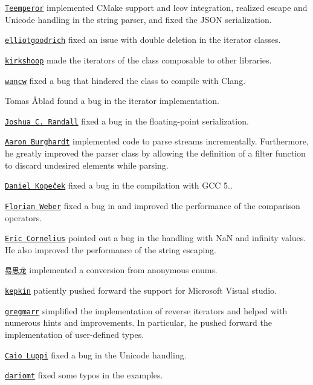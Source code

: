 \begin{DoxyItemize}
\item \href{https://github.com/Teemperor}{\tt Teemperor} implemented C\+Make support and lcov integration, realized escape and Unicode handling in the string parser, and fixed the J\+S\+ON serialization.
\item \href{https://github.com/elliotgoodrich}{\tt elliotgoodrich} fixed an issue with double deletion in the iterator classes.
\item \href{https://github.com/kirkshoop}{\tt kirkshoop} made the iterators of the class composable to other libraries.
\item \href{https://github.com/wanwc}{\tt wancw} fixed a bug that hindered the class to compile with Clang.
\item Tomas Åblad found a bug in the iterator implementation.
\item \href{https://github.com/jrandall}{\tt Joshua C. Randall} fixed a bug in the floating-\/point serialization.
\item \href{https://github.com/aburgh}{\tt Aaron Burghardt} implemented code to parse streams incrementally. Furthermore, he greatly improved the parser class by allowing the definition of a filter function to discard undesired elements while parsing.
\item \href{https://github.com/dkopecek}{\tt Daniel Kopeček} fixed a bug in the compilation with G\+CC 5..
\item \href{https://github.com/Florianjw}{\tt Florian Weber} fixed a bug in and improved the performance of the comparison operators.
\item \href{https://github.com/EricMCornelius}{\tt Eric Cornelius} pointed out a bug in the handling with NaN and infinity values. He also improved the performance of the string escaping.
\item \href{https://github.com/likebeta}{\tt 易思龙} implemented a conversion from anonymous enums.
\item \href{https://github.com/kepkin}{\tt kepkin} patiently pushed forward the support for Microsoft Visual studio.
\item \href{https://github.com/gregmarr}{\tt gregmarr} simplified the implementation of reverse iterators and helped with numerous hints and improvements. In particular, he pushed forward the implementation of user-\/defined types.
\item \href{https://github.com/caiovlp}{\tt Caio Luppi} fixed a bug in the Unicode handling.
\item \href{https://github.com/dariomt}{\tt dariomt} fixed some typos in the examples.

\end{DoxyItemize}
